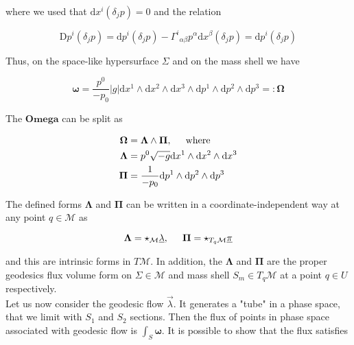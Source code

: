 \documentclass[11pt,a4paper,headinclude=true,DIV=14,BCOR=8mm,chapterprefix,listof=totoc,twoside,openright,abstracton]{scrbook}
\begin{document}
where we used that $\text{d}x^i(\delta_j p)=0$ and the relation

\begin{equation}
    \text{D}p^{i}(\delta_j p) = \text{d}p^{i}(\delta_j p) - {\Gamma^i}_{\alpha\beta}p^{\alpha}\text{d}x^{\beta}(\delta_j p) = \text{d}p^i(\delta_j p)
\end{equation}

Thus, on the space-like hypersurface $\Sigma$ and on the mass shell we have

\begin{equation}
    \boldsymbol{\omega} = \frac{p^0}{-p_0}|g|\text{d}x^1\wedge\text{d}x^2\wedge\text{d}x^3\wedge\text{d}p^1\wedge\text{d}p^2\wedge\text{d}p^3 =: \boldsymbol{\Omega}
\end{equation}

The $\boldsymbol{Omega}$ can be split as 

\begin{align}
    \boldsymbol{\Omega} &= \boldsymbol{\Lambda} \wedge \boldsymbol{\Pi}, \hspace{5mm} \text{where} \\
    \boldsymbol{\Lambda} &= p^0 \sqrt{-g}\text{d}x^1\wedge\text{d}x^2\wedge\text{d}x^3 \\
    \boldsymbol{\Pi} &=  \frac{1}{-p_0}\text{d}p^1\wedge\text{d}p^2\wedge\text{d}p^3
\end{align}

The defined forms $\boldsymbol{\Lambda}$ and $\boldsymbol{\Pi}$ can be written in a coordinate-independent way at any point $q\in\mathcal{M}$ as 

\begin{equation}
    \boldsymbol{\Lambda} = \star_{\mathcal{M}}\underline{\lambda}, \hspace{5mm} \boldsymbol{\Pi} = \star_{T_q\mathcal{M}}\underline{\pi}
\end{equation}

and this are intrinsic forms in $T\mathcal{M}$. In addition, the $\boldsymbol{\Lambda}$ and $\boldsymbol{\Pi}$ are the proper geodesics flux
volume form on $\Sigma\in\mathcal{M}$ and mass shell $S_m\in T_q\mathcal{M}$ at a point $q\in U$ respectively. \\

Let us now consider the geodesic flow $\vec{\lambda}$. It generates a "tube" in a phase space, that we limit with $S_1$ and $S_2$ sections. Then the flux of points in phase space associated with geodesic flow is $\int_{S}\boldsymbol{\omega}$. It is possible to show that the flux satisfies
\end{document}
